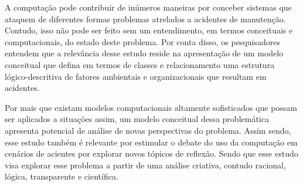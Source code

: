 A computação pode contribuir de inúmeros maneiras por conceber sistemas que ataquem de diferentes formas problemas atrelados a acidentes de manutenção. Contudo, isso não pode ser feito sem um entendimento, em termos conceituais e computacionais, do estado deste problema. Por conta disso, os pesquisadores entendem que a relevância desse estudo reside na apresentação de um modelo conceitual que defina em termos de classes e relacionamento uma estrutura lógico-descritiva de fatores ambientais e organizacionais que resultam em acidentes. 

Por mais que existam modelos computacionais altamente sofisticados que possam ser aplicados a situações assim, um modelo conceitual dessa problemática apresenta potencial de análise de novas perspectivas do problema. Assim sendo, esse estudo também é relevante por estimular o debate do uso da computação em cenários de acientes por explorar novos tópicos de reflexão. Sendo que esse estudo visa explorar esse problema a partir de uma análise criativa, contudo racional, lógica, transparente e científica. 